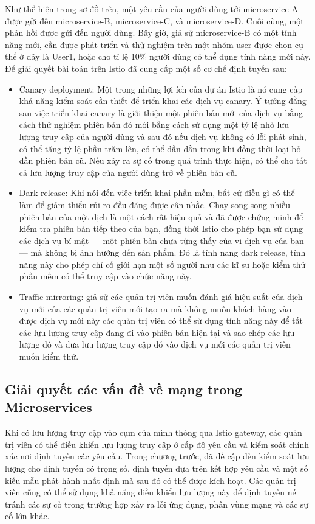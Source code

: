 \documentclass[14pt,a4paper]{book}
\begin{document}
			Như thể hiện trong sơ đồ trên, một yêu cầu của người dùng tới microservice-A được gửi đến microservice-B, microservice-C, và microservice-D. Cuối cùng, một phản hồi được gửi đến người dùng. Bây giờ, giả sử microservice-B có một tính năng mới, cần được phát triển và thử nghiệm trên một nhóm user được chọn cụ thể ở đây là User1, hoặc cho tỉ lệ 10\% người dùng có thể dụng tính năng mới này. 
			Để giải quyết bài toán trên Istio đã cung cấp một số cơ chế định tuyến sau:
			\begin{itemize}
				\item Canary deployment: Một trong những lợi ích của dự án Istio là nó cung cấp khả năng kiểm soát cần thiết để triển khai các dịch vụ canary. Ý tưởng đằng sau việc triển khai canary là giới thiệu một phiên bản mới của dịch vụ bằng cách thử nghiệm phiên bản đó mới bằng cách sử dụng một tỷ lệ nhỏ lưu lượng truy cập của người dùng và sau đó nếu dịch vụ không có lỗi phát sinh, có thể tăng tỷ lệ phần trăm lên, có thể dần dần trong khi đồng thời loại bỏ dần phiên bản cũ. Nếu xảy ra sự cố trong quá trình thực hiện, có thể cho tất cả lưu lượng truy cập của người dùng trở về phiên bản cũ.
				\item Dark release: Khi nói đến việc triển khai phần mềm, bất cứ điều gì có thể làm để giảm thiểu rủi ro đều đáng được cân nhắc. Chạy song song nhiều phiên bản của một dịch là một cách rất hiệu quả và đã được chứng minh để kiểm tra phiên bản tiếp theo của bạn, đồng thời Istio cho phép bạn sử dụng các dịch vụ bí mật — một phiên bản chưa từng thấy của vi dịch vụ của bạn — mà không bị ảnh hưởng đến sản phẩm. Đó là tính năng dark release, tính năng này cho phép chỉ cố giới hạn một số người như các kĩ sư hoặc kiểm thử phần mềm có thể truy cập vào chức năng này.
				\item Traffic mirroring: giả sử các quản trị viên muốn đánh giá hiệu suất của dịch vụ mới của các quản trị viên mới tạo ra mà không muốn khách hàng vào được dịch vụ mới này các quản trị viên có thể sử dụng tính năng này để tất các lưu lượng truy cập đang đi vào phiên bản hiện tại và sao chép các lưu lượng đó và đưa lưu lượng truy cập đó vào dịch vụ mới các quản trị viên muốn kiểm thử.
			\end{itemize}
			
			
		\subsection{Giải quyết các vấn đề về mạng trong Microservices}
\hspace{0.6cm}Khi có lưu lượng truy cập vào cụm của mình thông qua Istio gateway, các quản trị viên có thể điều khiển lưu lượng truy cập ở cấp độ yêu cầu và kiểm soát chính xác nơi định tuyến các yêu cầu. Trong chương trước, đã đề cập đến kiểm soát lưu lượng cho định tuyến có trọng số, định tuyến dựa trên kết hợp yêu cầu và một số kiểu mẫu phát hành nhất định mà sau đó có thể được kích hoạt. Các quản trị viên cũng có thể sử dụng khả năng điều khiển lưu lượng này để định tuyến né tránh các sự cố trong trường hợp xảy ra lỗi ứng dụng, phân vùng mạng và các sự cố lớn khác.
\end{document}
